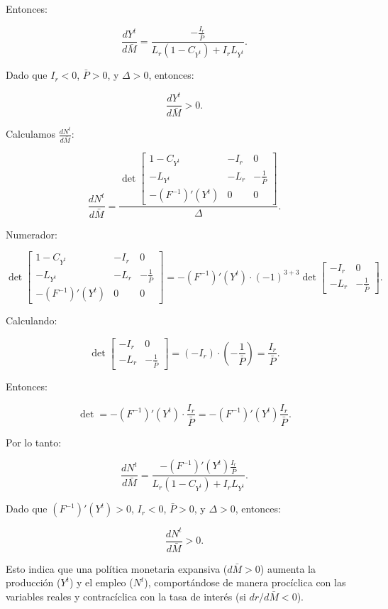 \documentclass[
  doc,
  floatsintext,
  longtable,
  a4paper,
  nolmodern,
  notxfonts,
  notimes,
  12pt,
  colorlinks=true,linkcolor=blue,citecolor=blue,urlcolor=blue]{apa7}
\begin{document}
\begin{enumerate}
  Entonces:

  \[
  \frac{dY^t}{d\bar{M}} = \frac{-\frac{I_r}{\bar{P}}}{L_r (1 - C_{Y^t}) + I_r L_{Y^t}}.
  \]

  Dado que \(I_r < 0\), \(\bar{P} > 0\), y \(\Delta > 0\), entonces:

  \[
  \frac{dY^t}{d\bar{M}} > 0.
  \]

  Calculamos \(\frac{dN^t}{d\bar{M}}\):

  \[
  \frac{dN^t}{d\bar{M}} = \frac{\det \begin{bmatrix}
  1 - C_{Y^t} & -I_r & 0 \\
  -L_{Y^t} & -L_r & -\frac{1}{\bar{P}} \\
  -(F^{-1})'(Y^t) & 0 & 0
  \end{bmatrix}}{\Delta}.
  \]

  Numerador:

  \[
  \det \begin{bmatrix}
  1 - C_{Y^t} & -I_r & 0 \\
  -L_{Y^t} & -L_r & -\frac{1}{\bar{P}} \\
  -(F^{-1})'(Y^t) & 0 & 0
  \end{bmatrix} = -(F^{-1})'(Y^t) \cdot (-1)^{3+3} \det \begin{bmatrix}
  -I_r & 0 \\
  -L_r & -\frac{1}{\bar{P}}
  \end{bmatrix}.
  \]

  Calculando:

  \[
  \det \begin{bmatrix}
  -I_r & 0 \\
  -L_r & -\frac{1}{\bar{P}}
  \end{bmatrix} = (-I_r) \cdot \left(-\frac{1}{\bar{P}}\right) = \frac{I_r}{\bar{P}}.
  \]

  Entonces:

  \[
  \det = -(F^{-1})'(Y^t) \cdot \frac{I_r}{\bar{P}} = -(F^{-1})'(Y^t) \frac{I_r}{\bar{P}}.
  \]

  Por lo tanto:

  \[
  \frac{dN^t}{d\bar{M}} = \frac{-(F^{-1})'(Y^t) \frac{I_r}{\bar{P}}}{L_r (1 - C_{Y^t}) + I_r L_{Y^t}}.
  \]

  Dado que \((F^{-1})'(Y^t) > 0\), \(I_r < 0\), \(\bar{P} > 0\), y
  \(\Delta > 0\), entonces:

  \[
  \frac{dN^t}{d\bar{M}} > 0.
  \]

  Esto indica que una política monetaria expansiva (\(d\bar{M} > 0\))
  aumenta la producción (\(Y^t\)) y el empleo (\(N^t\)), comportándose
  de manera procíclica con las variables reales y contracíclica con la
  tasa de interés (si \(dr/d\bar{M} < 0\)).
\end{enumerate}
\end{document}
